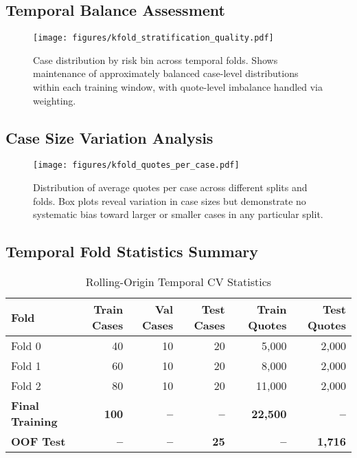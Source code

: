 \documentclass[11pt]{article}
\begin{document}
\subsection{Temporal Balance Assessment}

\begin{figure}[H]
\centering
\texttt{[image: figures/kfold\_stratification\_quality.pdf]}
\caption{Case distribution by risk bin across temporal folds. Shows maintenance of approximately balanced case-level distributions within each training window, with quote-level imbalance handled via weighting.}
\end{figure}

\subsection{Case Size Variation Analysis}

\begin{figure}[H]
\centering
\texttt{[image: figures/kfold\_quotes\_per\_case.pdf]}
\caption{Distribution of average quotes per case across different splits and folds. Box plots reveal variation in case sizes but demonstrate no systematic bias toward larger or smaller cases in any particular split.}
\end{figure}

\subsection{Temporal Fold Statistics Summary}

\begin{table}[H]
\centering
\caption{Rolling-Origin Temporal CV Statistics}
\begin{tabular}{lrrrrr}
\toprule
\textbf{Fold} & \textbf{Train Cases} & \textbf{Val Cases} & \textbf{Test Cases} & \textbf{Train Quotes} & \textbf{Test Quotes} \\
\midrule
Fold 0 & 40 & 10 & 20 & 5,000 & 2,000 \\
Fold 1 & 60 & 10 & 20 & 8,000 & 2,000 \\
Fold 2 & 80 & 10 & 20 & 11,000 & 2,000 \\
\midrule
\textbf{Final Training} & \textbf{100} & \textbf{--} & \textbf{--} & \textbf{22,500} & \textbf{--} \\
\textbf{OOF Test} & \textbf{--} & \textbf{--} & \textbf{25} & \textbf{--} & \textbf{1,716} \\

\bottomrule
\end{tabular}
\end{table}
\end{document}
